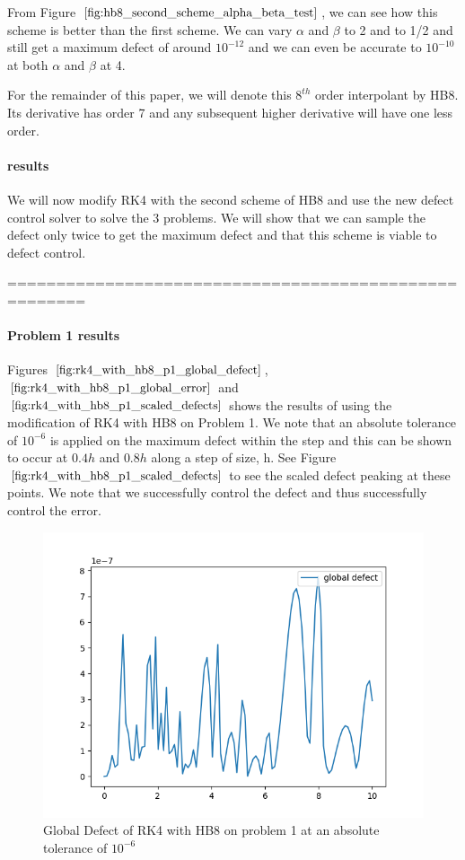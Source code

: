 \documentclass{article}
\begin{document}
From Figure $\ref{fig:hb8_second_scheme_alpha_beta_test}$, we can see how this scheme is better than the first scheme. We can vary $\alpha$ and $\beta$ to 2 and to 1/2 and still get a maximum defect of around $10^{-12}$ and we can even be accurate to $10^{-10}$ at both $\alpha$ and $\beta$ at 4. 

For the remainder of this paper, we will denote this $8^{th}$ order interpolant by HB8. Its derivative has order 7 and any subsequent higher derivative will have one less order.

\paragraph{results}
We will now modify RK4 with the second scheme of HB8 and use the new defect control solver to solve the 3 problems. We will show that we can sample the defect only twice to get the maximum defect and that this scheme is viable to defect control.

======================================================
\paragraph{Problem 1 results}
Figures $\ref{fig:rk4_with_hb8_p1_global_defect}$, $\ref{fig:rk4_with_hb8_p1_global_error}$ and $\ref{fig:rk4_with_hb8_p1_scaled_defects}$ shows the results of using the modification of RK4 with HB8 on Problem 1. We note that an absolute tolerance of $10^{-6}$ is applied on the maximum defect within the step and this can be shown to occur at $0.4h$ and $0.8h$ along a step of size, h. See Figure $\ref{fig:rk4_with_hb8_p1_scaled_defects}$ to see the scaled defect peaking at these points. We note that we successfully control the defect and thus successfully control the error.

\begin{figure}[H]
\centering
\includegraphics[width=0.7\linewidth]{./figures/rk4_with_hb8_p1_global_defect}
\caption{Global Defect of RK4 with HB8 on problem 1 at an absolute tolerance of $10^{-6}$}
\label{fig:rk4_with_hb8_p1_global_defect}
\end{figure}
\end{document}
